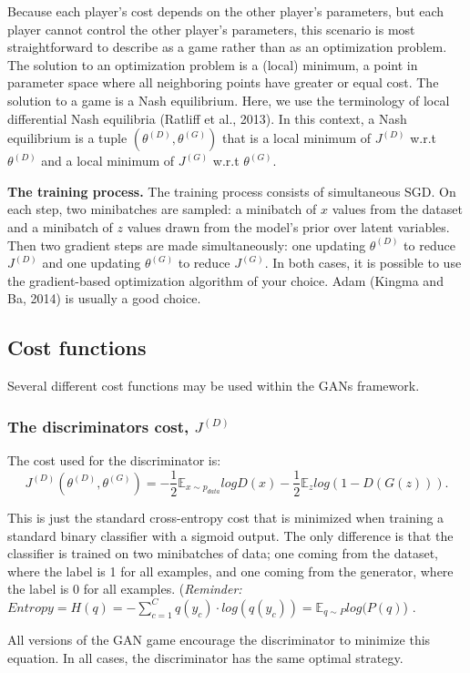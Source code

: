 \documentclass{scrartcl}
\begin{document}
Because each player's cost depends on the other player’s parameters, but each player cannot control the other player’s parameters, this scenario is most straightforward to describe as a game rather than as an optimization problem. The solution to an optimization problem is a (local) minimum, a point in parameter space where all neighboring points have greater or equal cost. The solution to a game is a Nash equilibrium. Here, we use the terminology of local differential Nash equilibria
(Ratliff et al., 2013). In this context, a Nash equilibrium is a tuple $(\theta^{(D)},\theta^{(G)})$ that is a local minimum of $J^{(D)}$ w.r.t $\theta^{(D)}$ and a local minimum of $J^{(G)}$ w.r.t $\theta^{(G)}$.

\textbf{The training process.} The training process consists of simultaneous SGD. On each step, two minibatches are sampled: a minibatch of $x$ values from the
dataset and a minibatch of $z$ values drawn from the model’s prior over latent
variables. Then two gradient steps are made simultaneously: one updating $\theta^{(D)}$ to reduce $J^{(D)}$ and one updating $\theta^{(G)}$ to reduce $J^{(G)}$. In both cases, it is possible to use the gradient-based optimization algorithm of your choice. Adam (Kingma and Ba, 2014) is usually a good choice.

\subsection{Cost functions}
Several different cost functions may be used within the GANs framework.

\subsubsection{The discriminators cost, $J^{(D)}$}
The cost used for the discriminator is:
$$J^{(D)}(\theta^{(D)},\theta^{(G)}) = -\frac{1}{2} \mathbb{E}_{x \sim{} p_{data}} log D(x) - \frac{1}{2} \mathbb{E}_z log(1 - D(G(z))).$$

This is just the standard cross-entropy cost that is minimized when training
a standard binary classifier with a sigmoid output. The only difference is that the classifier is trained on two minibatches of data; one coming from the dataset, where the label is 1 for all examples, and one coming from the generator, where the label is 0 for all examples. (\textit{Reminder:} $Entropy = H(q) = - \sum_{c=1}^C q(y_c) \cdot log(q(y_c)) = \mathbb{E}_{q\sim{}P} log(P(q)$) \cite{demys-tds}.

All versions of the GAN game encourage the discriminator to minimize this equation. In all cases, the discriminator has the same optimal strategy.
\end{document}
